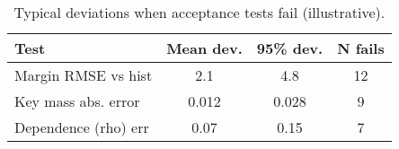 \begin{table}[t]
  \centering
  \small
  \caption{Typical deviations when acceptance tests fail (illustrative).}
  \label{tab:sim-fail}
  \begin{tabular}{lccc}
    \toprule
 \textbf{Test} & \textbf{Mean dev.} & \textbf{95\% dev.} & \textbf{N fails} \\
    \midrule
    Margin RMSE vs hist & 2.1 & 4.8 & 12 \\
    Key mass abs. error & 0.012 & 0.028 & 9 \\
    Dependence (rho) err & 0.07 & 0.15 & 7 \\
    \bottomrule
  \end{tabular}
\end{table}
